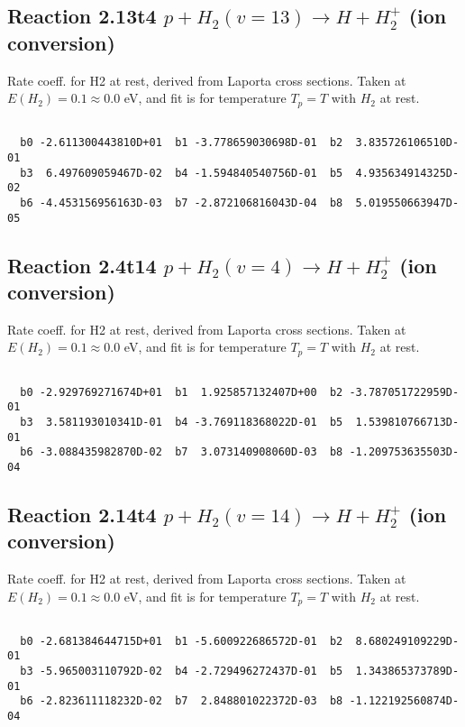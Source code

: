 \documentclass[12pt,dvipdfmx]{article}
\begin{document}
\newpage
\subsection{
Reaction 2.13t4
$ p + H_2(v=13) \rightarrow H + H_2^+$ (ion conversion)
}
Rate coeff. for H2 at rest, derived from Laporta cross sections.
Taken at $E(H_2) = 0.1 \approx 0.0$ eV,  and fit is for temperature $T_p=T$ with $H_2$ at rest.

\begin{small}\begin{verbatim}

  b0 -2.611300443810D+01  b1 -3.778659030698D-01  b2  3.835726106510D-01
  b3  6.497609059467D-02  b4 -1.594840540756D-01  b5  4.935634914325D-02
  b6 -4.453156956163D-03  b7 -2.872106816043D-04  b8  5.019550663947D-05

\end{verbatim}\end{small}

\newpage
\subsection{
Reaction 2.4t14
$ p + H_2(v=4) \rightarrow H + H_2^+$ (ion conversion)
}
Rate coeff. for H2 at rest, derived from Laporta cross sections.
Taken at $E(H_2) = 0.1 \approx 0.0$ eV,  and fit is for temperature $T_p=T$ with $H_2$ at rest.

\begin{small}\begin{verbatim}

  b0 -2.929769271674D+01  b1  1.925857132407D+00  b2 -3.787051722959D-01
  b3  3.581193010341D-01  b4 -3.769118368022D-01  b5  1.539810766713D-01
  b6 -3.088435982870D-02  b7  3.073140908060D-03  b8 -1.209753635503D-04

\end{verbatim}\end{small}

\newpage
\subsection{
Reaction 2.14t4
$ p + H_2(v=14) \rightarrow H + H_2^+$ (ion conversion)
}
Rate coeff. for H2 at rest, derived from Laporta cross sections.
Taken at $E(H_2) = 0.1 \approx 0.0$ eV,  and fit is for temperature $T_p=T$ with $H_2$ at rest.

\begin{small}\begin{verbatim}

  b0 -2.681384644715D+01  b1 -5.600922686572D-01  b2  8.680249109229D-01
  b3 -5.965003110792D-02  b4 -2.729496272437D-01  b5  1.343865373789D-01
  b6 -2.823611118232D-02  b7  2.848801022372D-03  b8 -1.122192560874D-04

\end{verbatim}\end{small}
\end{document}
